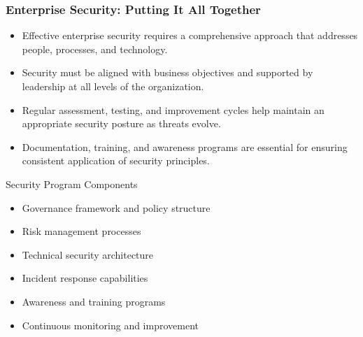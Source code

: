 \documentclass{beamer}
\begin{document}
\begin{frame}
    \frametitle{Enterprise Security: Putting It All Together}
    \begin{itemize}
        \item Effective enterprise security requires a comprehensive approach that addresses people, processes, and technology.
        \item Security must be aligned with business objectives and supported by leadership at all levels of the organization.
        \item Regular assessment, testing, and improvement cycles help maintain an appropriate security posture as threats evolve.
        \item Documentation, training, and awareness programs are essential for ensuring consistent application of security principles.
    \end{itemize}
    
    \begin{exampleblock}{Security Program Components}
        \begin{itemize}
            \item Governance framework and policy structure
            \item Risk management processes
            \item Technical security architecture
            \item Incident response capabilities
            \item Awareness and training programs
            \item Continuous monitoring and improvement
        \end{itemize}
    \end{exampleblock}
\end{frame}
\end{document}
